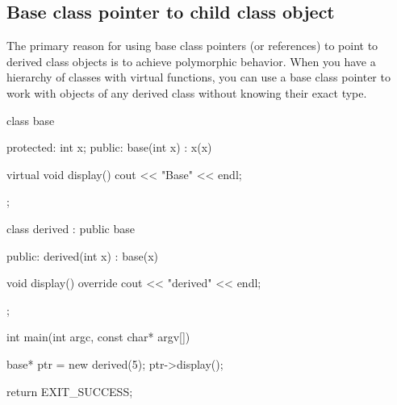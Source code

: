 \documentclass{report}
\begin{document}
    \subsection{Base class pointer to child class object}
    \bigbreak \noindent 
    The primary reason for using base class pointers (or references) to point to derived class objects is to achieve polymorphic behavior. When you have a hierarchy of classes with virtual functions, you can use a base class pointer to work with objects of any derived class without knowing their exact type.
    \bigbreak \noindent 
    \begin{cppcode}
class base {
protected:
    int x;
public: 
    base(int x) : x(x) {}

    virtual void display() {
        cout << "Base" << endl;
    }

};

class derived : public base {
public: 
    derived(int x) : base(x) {}

    void display() override{
        cout << "derived" << endl;
    }

};

int main(int argc, const char* argv[]) {

    base* ptr = new derived(5);
    ptr->display();


    return EXIT_SUCCESS;
}
    \end{cppcode}
    
    \pagebreak
\end{document}
